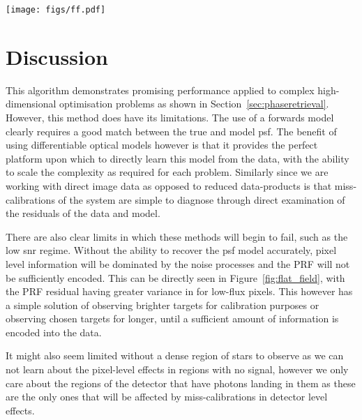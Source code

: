 \documentclass[twocolumn]{spie}
\begin{document}
\begin{figure*}
    \centering
    \texttt{[image: figs/ff.pdf]}
    \caption{This figure shows the PRF values after optimisation. The left panel shows the correlation between the pixel-level true and recovered values. Each ploint is color-coded with the total flux incident to each pixel, ie its \ac{snr}. The pixels with a greater signal are recovered better as expected. The right panel shows the histogram of these residuals, with the majority of values being very well recovered and small symmetric about a residual of zero.}
    \label{fig:flat_field}
\end{figure*}

\section{Discussion}

This algorithm demonstrates promising performance applied to complex high-dimensional optimisation problems as shown in Section~\ref{sec:phaseretrieval}. However, this method does have its limitations. The use of a forwards model clearly requires a good match between the true and model \ac{psf}. The benefit of using differentiable optical models however is that it provides the perfect platform upon which to directly learn this model from the data, with the ability to scale the complexity as required for each problem. Similarly since we are working with direct image data as opposed to reduced data-products is that miss-calibrations of the system are simple to diagnose through direct examination of the residuals of the data and model.

There are also clear limits in which these methods will begin to fail, such as the low \ac{snr} regime. Without the ability to recover the \ac{psf} model accurately, pixel level information will be dominated by the noise processes and the PRF will not be sufficiently encoded. This can be directly seen in Figure~\ref{fig:flat_field}, with the PRF residual having greater variance in for low-flux pixels. This however has a simple solution of observing brighter targets for calibration purposes or observing chosen targets for longer, until a sufficient amount of information is encoded into the data.

It might also seem limited without a dense region of stars to observe as we can not learn about the pixel-level effects in regions with no signal, however we only care about the regions of the detector that have photons landing in them as these are the only ones that will be affected by miss-calibrations in detector level effects.
\end{document}
